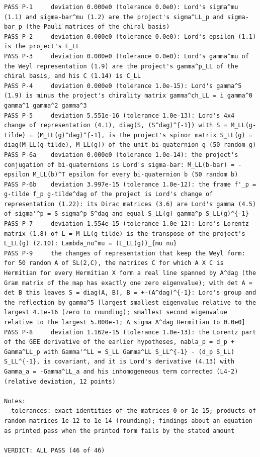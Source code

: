\documentclass[
  10pt,
]{article}
\begin{document}
\begin{verbatim}
PASS P-1     deviation 0.000e0 (tolerance 0.0e0): Lord's sigma^mu (1.1) and sigma-bar^mu (1.2) are the project's sigma^LL_p and sigma-bar_p (the Pauli matrices of the chiral basis)
PASS P-2     deviation 0.000e0 (tolerance 0.0e0): Lord's epsilon (1.1) is the project's E_LL
PASS P-3     deviation 0.000e0 (tolerance 0.0e0): Lord's gamma^mu of the Weyl representation (1.9) are the project's gamma^p_LL of the chiral basis, and his C (1.14) is C_LL
PASS P-4     deviation 0.000e0 (tolerance 1.0e-15): Lord's gamma^5 (1.9) is minus the project's chirality matrix gamma^ch_LL = i gamma^0 gamma^1 gamma^2 gamma^3
PASS P-5     deviation 5.551e-16 (tolerance 1.0e-13): Lord's 4x4 change of representation (4.1), diag(S, (S^dag)^{-1}) with S = M_LL(g-tilde) = (M_LL(g)^dag)^{-1}, is the project's spinor matrix S_LL(g) = diag(M_LL(g-tilde), M_LL(g)) of the unit bi-quaternion g (50 random g)
PASS P-6a    deviation 0.000e0 (tolerance 1.0e-14): the project's conjugation of bi-quaternions is Lord's sigma-bar: M_LL(b-bar) = -epsilon M_LL(b)^T epsilon for every bi-quaternion b (50 random b)
PASS P-6b    deviation 3.997e-15 (tolerance 1.0e-12): the frame f'_p = g-tilde f_p g-tilde^dag of the project is Lord's change of representation (1.22): its Dirac matrices (3.6) are Lord's gamma (4.5) of sigma'^p = S sigma^p S^dag and equal S_LL(g) gamma^p S_LL(g)^{-1}
PASS P-7     deviation 1.554e-15 (tolerance 1.0e-12): Lord's Lorentz matrix (1.8) of L = M_LL(g-tilde) is the transpose of the project's L_LL(g) (2.10): Lambda_nu^mu = (L_LL(g))_{mu nu}
PASS P-9     the changes of representation that keep the Weyl form: for 50 random A of SL(2,C), the matrices C for which A X C is Hermitian for every Hermitian X form a real line spanned by A^dag (the Gram matrix of the map has exactly one zero eigenvalue); with det A = det B this leaves S = diag(A, B), B = +-(A^dag)^{-1}: Lord's group and the reflection by gamma^5 [largest smallest eigenvalue relative to the largest 4.1e-16 (zero to rounding); smallest second eigenvalue relative to the largest 5.000e-1; A sigma A^dag Hermitian to 0.0e0]
PASS P-8     deviation 1.162e-15 (tolerance 1.0e-13): the Lorentz part of the GEE derivative of the earlier hypotheses, nabla_p = d_p + Gamma^LL_p with Gamma'^LL = S_LL Gamma^LL S_LL^{-1} - (d_p S_LL) S_LL^{-1}, is covariant, and it is Lord's derivative (4.13) with Gamma_a = -Gamma^LL_a and his inhomogeneous term corrected (L4-2) (relative deviation, 12 points)

Notes:
  tolerances: exact identities of the matrices 0 or 1e-15; products of random matrices 1e-12 to 1e-14 (rounding); findings about an equation as printed pass when the printed form fails by the stated amount

VERDICT: ALL PASS (46 of 46)
\end{verbatim}
\end{document}
